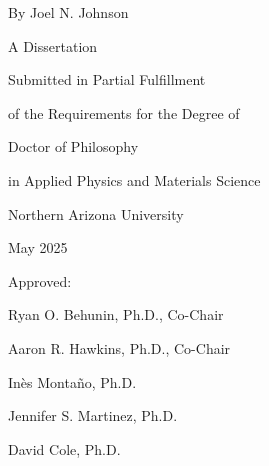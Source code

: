 \begin{centering}
\begin{large}
\begin{spacing}{1.8}

\vspace*{\baselineskip}

\dissertationTitle{}

\thispagestyle{empty} %

\vspace{\baselineskip}

By Joel N. Johnson

\vspace{10mm}

A Dissertation

Submitted in Partial Fulfillment

of the Requirements for the Degree of


Doctor of Philosophy

in Applied Physics and Materials Science

\vspace{\baselineskip}

Northern Arizona University

May 2025

\vspace{2\baselineskip}

Approved:

Ryan O. Behunin, Ph.D., Co-Chair

Aaron R. Hawkins, Ph.D., Co-Chair

Inès Montaño, Ph.D.

Jennifer S. Martinez, Ph.D.

David Cole, Ph.D.

\end{spacing}
\end{large}
\end{centering}

